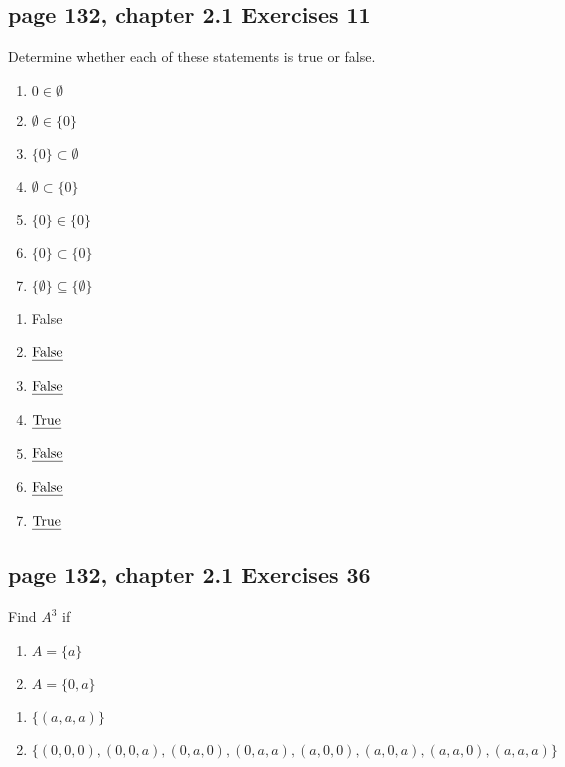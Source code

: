 \documentclass[sigconf]{acmart}
\begin{document}
\subsection{page 132, chapter 2.1 Exercises 11}
\begin{shaded}
    Determine whether each of these statements is true or false.
    \begin{enumerate}[label=(\alph*)]
    	\item $0 \in \emptyset$
    	\item $\emptyset \in \{0\}$
            \item $\{0\} \subset \emptyset$
            \item $\emptyset \subset \{0\}$
            \item $\{0\} \in \{0\}$
            \item $\{0\} \subset \{0\}$
            \item $\{\emptyset\} \subseteq \{\emptyset\}$
    \end{enumerate}
\end{shaded}  
\begin{enumerate}[label=(\alph*)]
	\item False
	\item $\text{\uline{False}}$
 	\item $\text{\uline{False}}$
  	\item $\text{\uline{True}}$
   	\item $\text{\uline{False}}$
        \item $\text{\uline{False}}$
        \item $\text{\uline{True}}$
\end{enumerate}

\subsection{page 132, chapter 2.1 Exercises 36}
\begin{shaded}
    Find $A^3$ if
    \begin{enumerate}[label=(\alph*)]
    	\item $A = \{a\}$
    	\item $A = \{0, a\}$
    \end{enumerate}
\end{shaded}  
\begin{enumerate}[label=(\alph*)]
	\item $\{(a, a, a)\}$
	\item \underline{$\{(0,0,0),(0,0,a),(0,a,0),(0,a,a),(a,0,0),(a,0,a),(a,a,0),(a,a,a)\}$}
\end{enumerate}
\end{document}
